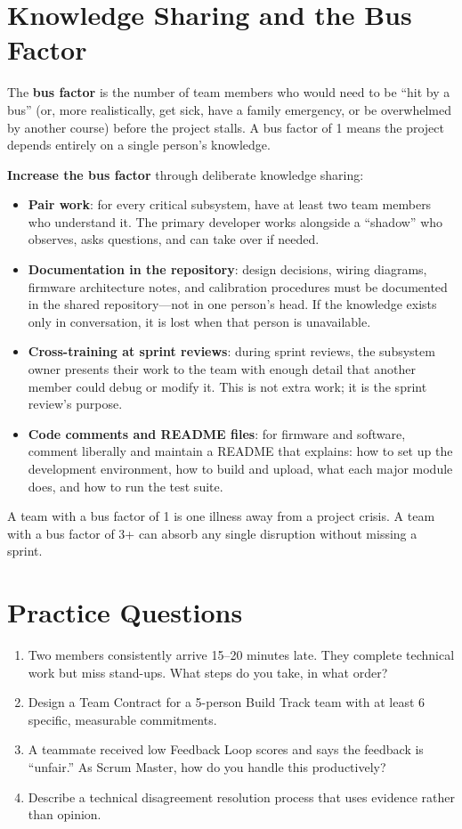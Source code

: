 \section{Knowledge Sharing and the Bus Factor}
The \textbf{bus factor} is the number of team members who would need to be ``hit by a bus'' (or, more realistically, get sick, have a family emergency, or be overwhelmed by another course) before the project stalls. A bus factor of 1 means the project depends entirely on a single person's knowledge.

\textbf{Increase the bus factor} through deliberate knowledge sharing:
\begin{itemize}[nosep,leftmargin=1.5em]
\item \textbf{Pair work}: for every critical subsystem, have at least two team members who understand it. The primary developer works alongside a ``shadow'' who observes, asks questions, and can take over if needed.
\item \textbf{Documentation in the repository}: design decisions, wiring diagrams, firmware architecture notes, and calibration procedures must be documented in the shared repository---not in one person's head. If the knowledge exists only in conversation, it is lost when that person is unavailable.
\item \textbf{Cross-training at sprint reviews}: during sprint reviews, the subsystem owner presents their work to the team with enough detail that another member could debug or modify it. This is not extra work; it is the sprint review's purpose.
\item \textbf{Code comments and README files}: for firmware and software, comment liberally and maintain a README that explains: how to set up the development environment, how to build and upload, what each major module does, and how to run the test suite.
\end{itemize}

A team with a bus factor of 1 is one illness away from a project crisis. A team with a bus factor of 3+ can absorb any single disruption without missing a sprint.


\section{Practice Questions}
\begin{enumerate}[leftmargin=1.5em]
\item Two members consistently arrive 15--20 minutes late. They complete technical work but miss stand-ups. What steps do you take, in what order?
\item Design a Team Contract for a 5-person Build Track team with at least 6 specific, measurable commitments.
\item A teammate received low Feedback Loop scores and says the feedback is ``unfair.'' As Scrum Master, how do you handle this productively?
\item Describe a technical disagreement resolution process that uses evidence rather than opinion.
\end{enumerate}


